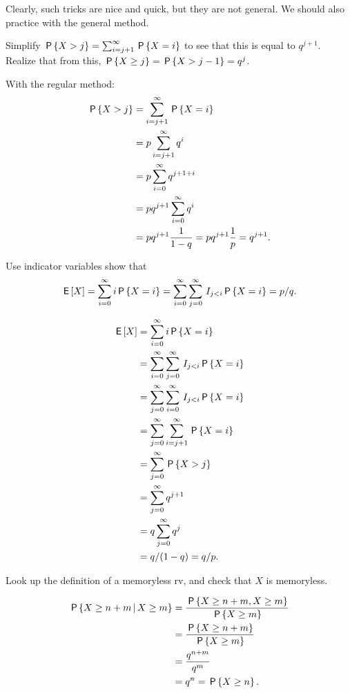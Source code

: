 Clearly, such tricks are nice and quick, but they are not general. We should also practice with the general method.

\begin{exercise}
Simplify $\P{X>j}= \sum_{i=j+1}^{\infty} \P{X=i}$ to see that this is equal to $q^{j+1}$.
Realize that from this, $\P{X\geq j}  = \P{X>j-1} = q^{j}$.
\begin{solution}
With the regular method:
  \begin{align*}
\P{X>j}
&= \sum_{i=j+1}^{\infty} \P{X=i} \\
&= p\sum_{i=j+1}^{\infty} q^{i} \\
&= p\sum_{i=0}^{\infty} q^{j+1+i} \\
&= pq^{j+1}\sum_{i=0}^{\infty} q^{i} \\
&= pq^{j+1}\frac 1 {1-q} =
p q^{j+1} \frac 1 p = q^{j+1}.
  \end{align*}
\end{solution}
\end{exercise}


\begin{exercise}\label{ex:12}
Use indicator variables show that
  \begin{equation*}
\E X
= \sum_{i=0}^{\infty} i\P{X=i}
=  \sum_{i=0}^{\infty} \sum_{j=0}^{\infty} \1{j<i} \P{X=i} =p/q.
\end{equation*}
\begin{solution}
  \begin{align*}
\E X
&= \sum_{i=0}^{\infty} i\P{X=i} \\
&=  \sum_{i=0}^{\infty} \sum_{j=0}^{\infty} \1{j<i} \P{X=i} \\
&=  \sum_{j=0}^{\infty} \sum_{i=0}^{\infty} \1{j<i} \P{X=i} \\
&=  \sum_{j=0}^{\infty} \sum_{i=j+1}^{\infty}  \P{X=i} \\
&=  \sum_{j=0}^{\infty}  \P{X>j} \\
&=  \sum_{j=0}^{\infty}  q^{j+1}\\
&=  q \sum_{j=0}^{\infty}  q^{j}\\
&=  q/(1-q) = q/p.
  \end{align*}
\end{solution}
\end{exercise}

\begin{exercise}
Look up the definition of a memoryless rv, and check that $X$ is memoryless.
\begin{solution}
  \begin{align*}
\P{X\geq n+m\given X\geq m}
&= \frac{ \P{X\geq n+m,  X\geq m}}{\P{X\geq m}} \\
&= \frac{ \P{X\geq n+m}}{\P{X\geq m}} \\
&= \frac{ q^{n+m}}{q^m} \\
&= q^n= \P{X\geq n}.
  \end{align*}
\end{solution}
\end{exercise}

